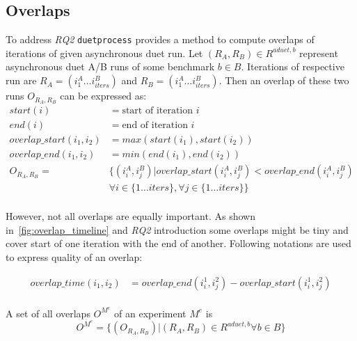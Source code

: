 \subsection{Overlaps}
\label{sec:overlaps}

To address \emph{RQ2} \lstinline{duetprocess} provides a method to compute overlaps of iterations of given asynchronous duet run.
Let $(R_A, R_B) \in R^{aduet, b}$ represent asynchronous duet A/B runs of some benchmark $b \in B$.
Iterations of respective run are $R_A = (i^A_1 \dots i^B_{iters})$ and $R_B = (i^A_1 \dots i^B_{iters})$.
Then an overlap of these two runs $O_{R_A, R_B}$ can be expressed as:
\begin{align*}
start(i) &= \text{start of iteration }i \\
end(i) &= \text{end of iteration } i \\
overlap\_start(i_1, i_2) &= max(start(i_1), start(i_2)) \\
overlap\_end(i_1, i_2) &= min(end(i_1), end(i_2)) \\
O_{R_A, R_B} =& \{(i^A_i, i^B_j) | overlap\_start(i^A_i, i^B_j) < overlap\_end(i^A_i, i^B_j) \\
              &\forall i \in \{1 \dots iters\}, \forall j \in \{1 \dots iters\}\} \\
\end{align*} 

However, not all overlaps are equally important.
As shown in~\cref{fig:overlap_timeline} and \emph{RQ2} introduction some overlaps might be tiny and cover start of one iteration with the end of another.
Following notations are used to express quality of an overlap:

\begin{align*}
overlap\_time(i_1, i_2) &= overlap\_end(i^1_i, i^2_j) - overlap\_start(i^1_i, i^2_j) \\
\end{align*}

A set of all overlaps $O^{M^e}$ of an experiment $M^e$ is
\[O^{M^e} = \{(O_{R_A, R_B}) | (R_A, R_B) \in R^{aduet, b} \forall b \in B \}\]
